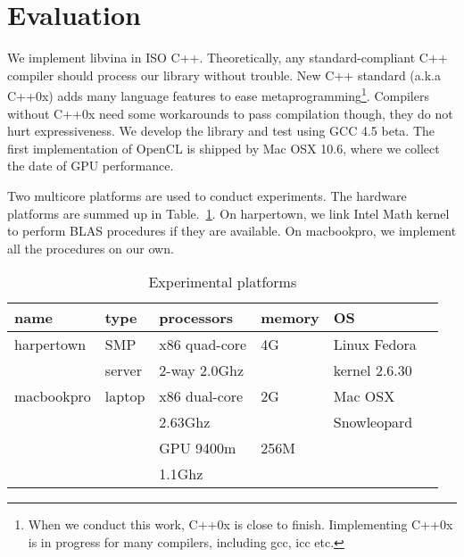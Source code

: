 \section{Evaluation}\label{sec:eval}
We implement libvina in ISO
C++. Theoretically, any standard-compliant C++ compiler
should process our library without trouble. New C++ standard (a.k.a C++0x\cite{c++0x}) adds many language features to ease metaprogramming\footnote{When we conduct this work, C++0x is close to finish. Iimplementing C++0x
  is in progress for many compilers, including gcc, icc etc.}. Compilers
without C++0x need some workarounds to pass compilation
though, they do not hurt expressiveness. We develop the library and
test using GCC 4.5 beta.  The
first implementation of OpenCL is shipped by Mac OSX 10.6, where we
collect the date of GPU performance.

Two multicore platforms are used to conduct experiments. The hardware
platforms are summed up in Table.~\ref{tbl:mach}. On harpertown, we link Intel Math kernel to perform BLAS procedures
if they are available. On macbookpro, we implement all the procedures on
our own. 

\begin{table}[hbt]
\caption{Experimental platforms}\label{tbl:mach}
\begin{center}
\begin{tabular}{|l|l|l|l|l|r|}
\hline
\textbf{name}&\textbf{type}&\textbf{processors}&\textbf{memory}&\textbf{OS}\\
\hline
harpertown&SMP &x86 quad-core  &4G&Linux Fedora\\
                  &  server &   
2-way  2.0Ghz & &kernel 2.6.30\\
\hline
macbookpro&laptop &x86 dual-core &2G&Mac OSX\\
                    &           & 2.63Ghz         &  &Snowleopard\\
                   &           &GPU 9400m    &256M & \\
                    &           & 1.1Ghz   & &\\
\hline
\end{tabular} 
\end{center}
\end{table}


